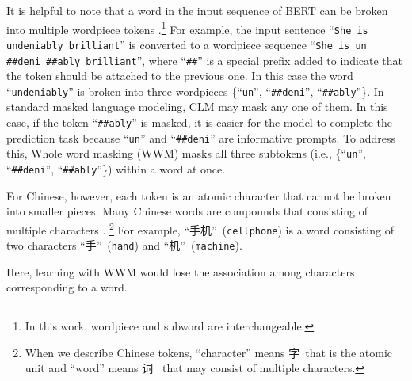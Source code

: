 \documentclass[11pt]{article}
\begin{document}



It is helpful to note that a word in the input sequence of BERT can be broken into multiple wordpiece tokens \cite{wu2016google}.\footnote{In this work, wordpiece and subword are interchangeable.} 
For example, the input sentence ``\texttt{She is undeniably brilliant}'' is converted to a wordpiece sequence ``\texttt{She is un \#\#deni \#\#ably brilliant}'', where ``\texttt{\#\#}'' is a special prefix added to indicate that the token should be attached to the previous one. 
In this case the word ``\texttt{undeniably}'' is broken into three wordpieces  \{``\texttt{un}'', ``\texttt{\#\#deni}'', ``\texttt{\#\#ably}''\}.
In standard masked language modeling, CLM may mask any one of them. In this case, if the token ``\texttt{\#\#ably}'' is masked, it is easier for the model to complete the prediction task because ``\texttt{un}'' and ``\texttt{\#\#deni}'' are informative prompts.
To address this, Whole word masking (WWM) masks all three subtokens (i.e., \{``\texttt{un}'', ``\texttt{\#\#deni}'', ``\texttt{\#\#ably}''\}) within a word at once.
\begin{CJK*}{UTF8}{gbsn}
For Chinese, however, each token is an atomic character that cannot be broken into smaller pieces. Many Chinese words are compounds that consisting of 
multiple characters \cite{Wood2009ContemporaryPO}. \footnote{When we describe Chinese tokens, ``character'' means 字\  that is the atomic unit and ``word'' means 词 \ that may consist of multiple characters.}
For example, ``手机''\ (\texttt{cellphone}) is a word consisting of two characters ``手''\ (\texttt{hand}) and ``机''\ (\texttt{machine}). 
\end{CJK*}
Here, learning with WWM would lose the association among characters corresponding to a word.
\end{document}
